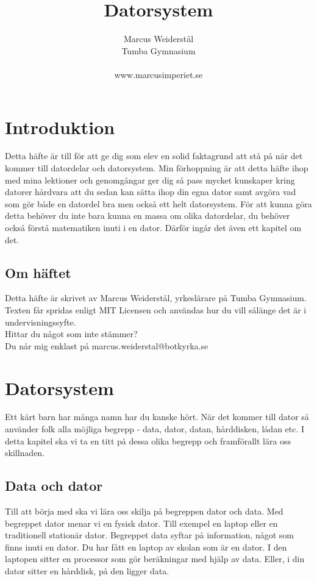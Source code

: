 \documentclass[12pt, letterpaper]{report}
\title{Datorsystem}
\author{Marcus Weiderstål \\ Tumba Gymnasium \\ \\ www.marcusimperiet.se}
\date{}
\begin{document}
\begin{titlepage}
\maketitle
\end{titlepage}

\tableofcontents{}
\chapter{Introduktion}
Detta häfte är till för att ge dig som elev en solid faktagrund att stå på när det kommer till datordelar och datorsystem. Min förhoppning är att detta häfte ihop med mina lektioner och genomgångar ger dig så pass mycket kunskaper kring datorer hårdvara att du sedan kan sätta ihop din egna dator samt avgöra vad som gör både en datordel bra men också ett helt datorsystem. För att kunna göra detta behöver du inte bara kunna en massa om olika datordelar, du behöver också förstå matematiken inuti i en dator. Därför ingår det även ett kapitel om det.

\section{Om häftet}
Detta häfte är skrivet av Marcus Weiderstål, yrkeslärare på Tumba Gymnasium. Texten får spridas enligt MIT Licensen och användas hur du vill sålänge det är i undervisningssyfte.\\Hittar du något som inte stämmer?\\ Du når mig enklast på  marcus.weiderstal@botkyrka.se
\newpage 

\chapter{Datorsystem}
Ett kärt barn har många namn har du kanske hört. När det kommer till dator så använder folk alla möjliga begrepp - data, dator, datan, hårddisken, lådan etc. I detta kapitel ska vi ta en titt på dessa olika begrepp och framförallt lära oss skillnaden.

\section{Data och dator}
Till att börja med ska vi lära oss skilja på begreppen dator och data. Med begreppet dator menar vi en fysisk dator. Till exempel en laptop eller en traditionell stationär dator. Begreppet data syftar på information, något som finns inuti en dator. Du har fått en laptop av skolan som är en dator. I den laptopen sitter en processor som gör beräkningar med hjälp av data. Eller, i din dator sitter en hårddisk, på den ligger data. 
\end{document}
